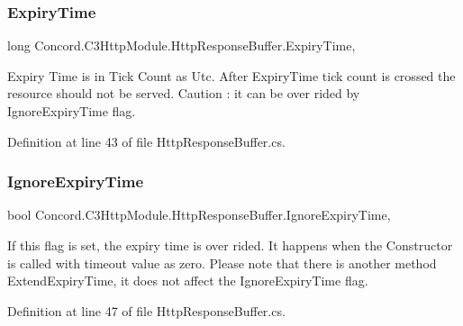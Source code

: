 \subsubsection{\texorpdfstring{ExpiryTime}{ExpiryTime}}
{\footnotesize\ttfamily long Concord.\+C3\+Http\+Module.\+Http\+Response\+Buffer.\+Expiry\+Time\hspace{0.3cm}{\ttfamily [get]}, {}}



Expiry Time is in Tick Count as Utc. After Expiry\+Time tick count is crossed the resource should not be served. Caution \+: it can be over rided by Ignore\+Expiry\+Time flag. 



Definition at line 43 of file Http\+Response\+Buffer.\+cs.

\mbox{\label{class_concord_1_1_c3_http_module_1_1_http_response_buffer_aeb642c055b040fe5d7f04e58a1b82ee4}} 
\subsubsection{\texorpdfstring{IgnoreExpiryTime}{IgnoreExpiryTime}}
{\footnotesize\ttfamily bool Concord.\+C3\+Http\+Module.\+Http\+Response\+Buffer.\+Ignore\+Expiry\+Time\hspace{0.3cm}{\ttfamily [get]}, {}}



If this flag is set, the expiry time is over rided. It happens when the Constructor is called with timeout value as zero. Please note that there is another method Extend\+Expiry\+Time, it does not affect the Ignore\+Expiry\+Time flag. 



Definition at line 47 of file Http\+Response\+Buffer.\+cs.

\mbox{\label{class_concord_1_1_c3_http_module_1_1_http_response_buffer_adf6f6e182181150ba1dd0c67c15483a0}} 
